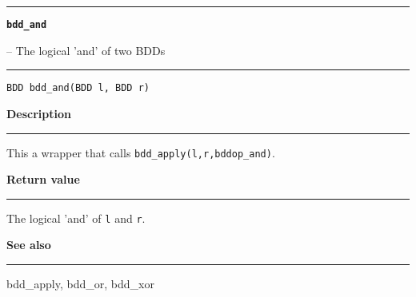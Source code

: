 \begin{minipage}{\textwidth}

\noindent\begin{minipage}{\textwidth}
\rule{\textwidth}{0.5mm}
{\tt\bf bdd\_and }
\--- The logical 'and' of two BDDs  \hspace{\fill}
\\\rule[1.5ex]{\textwidth}{0.5mm}
\end{minipage}

\noindent\begin{verbatim}
BDD bdd_and(BDD l, BDD r) 
\end{verbatim}

\vspace{\parsep}\noindent
{\bf Description}\\\rule[1.5ex]{\textwidth}{0.2mm}\vspace{-1.5ex}\setlength{\parindent}{1em}
This a wrapper that calls {\tt bdd\_apply(l,r,bddop\_and)}. 

\setlength{\parindent}{0em}\vspace{\parsep}\vspace{\baselineskip}\noindent
{\bf Return value}\\\rule[1.5ex]{\textwidth}{0.2mm}\vspace{-1.5ex}
The logical 'and' of {\tt l} and {\tt r}. 

\vspace{\parsep}\vspace{\baselineskip}\noindent
{\bf See also}\\\rule[1.5ex]{\textwidth}{0.2mm}\vspace{-1.5ex}
bdd\_apply, bdd\_or, bdd\_xor 
\end{minipage}
\vspace{8ex}

